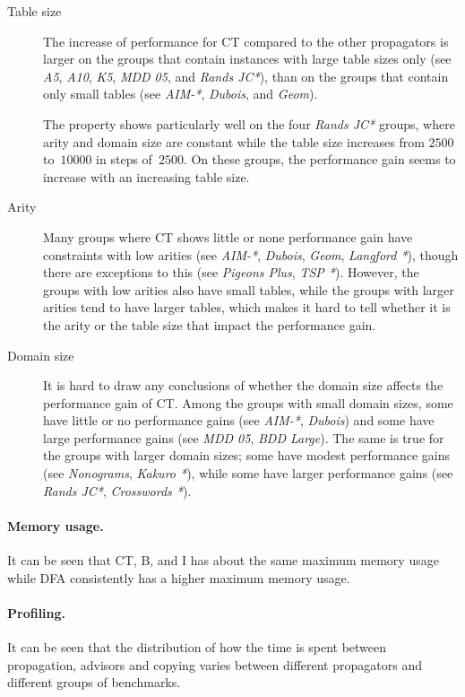 \documentclass[a4paper,11pt]{article}
\numberwithin{equation}{section}
\begin{document}
\begin{description}
  \item[Table size] The increase
    of performance for CT compared to the other propagators
    is larger on the groups that contain 
    instances with large table sizes only (see \emph{A5}, \emph{A10},
    \emph{K5}, \emph{MDD 05}, and \emph{Rands JC*}), than on the groups
    that contain only small tables (see \emph{AIM-*}, \emph{Dubois}, and \emph{Geom}).
    
    The property shows particularly well on the four \emph{Rands JC*} groups, where
    arity and domain size are constant while the table size increases from
    $2500$ to~$10000$ in steps of~$2500$. On these groups, the performance gain
    seems to increase with an increasing table size.

    \item[Arity] Many groups where CT shows little or none performance gain have
      constraints with low arities (see \emph{AIM-*}, \emph{Dubois}, \emph{Geom},
      \emph{Langford *}), though there are exceptions to this (see \emph{Pigeons Plus},
      \emph{TSP *}). 
      However, the groups with low arities also have small tables, while the groups
      with larger arities tend to have larger tables, which makes it hard to
      tell whether it is the arity or the table size that impact the performance gain.
      
    \item[Domain size] It is hard to draw any conclusions of whether the domain size affects
      the performance gain of CT. Among the groups with small domain sizes, some
      have little or no performance gains (see \emph{AIM-*}, \emph{Dubois}) and
      some have large performance gains (see \emph{MDD 05}, \emph{BDD Large}).
      The same is true for the groups with larger domain sizes; some have
      modest performance gains (see \emph{Nonograms}, \emph{Kakuro *}),
      while some have larger performance gains (see \emph{Rands JC*}, \emph{Crosswords *}).
\end{description}

\paragraph{Memory usage.}
It can be seen that CT, B, and I has about the same maximum memory usage 
while DFA consistently has a higher maximum memory usage.
  
\paragraph{Profiling.}
It can be seen that the distribution of how the time is spent between propagation, advisors
and copying varies between different propagators and different groups of benchmarks.
\end{document}
